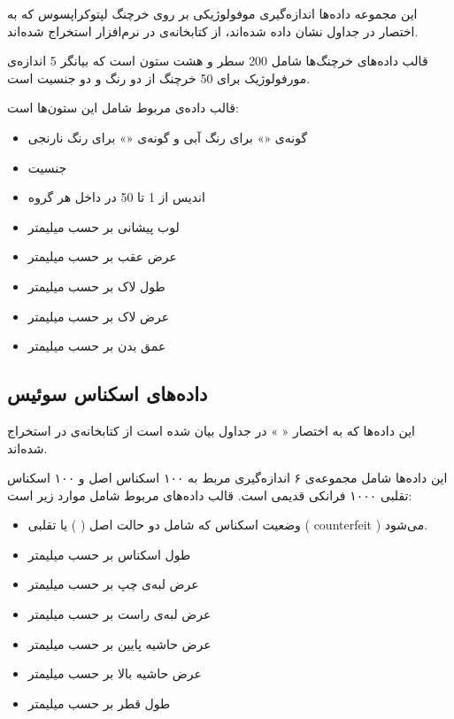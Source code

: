 این مجموعه داده‌ها اندازه‌گیری موفولوژیکی
بر روی خرچنگ لپتوکراپسوس  که به اختصار
در جداول نشان داده شده‌اند، از کتابخانه‌ی 
\cite{rMASS}
در نرم‌افزار 
استخراج شده‌اند.

قالب داده‌های خرچنگ‌ها شامل 200 سطر و هشت ستون است که بیانگر 5 اندازه‌ی مورفولوژیک برای 50 خرچنگ از دو رنگ و دو جنسیت است.

قالب داده‌ی مربوط شامل این ستون‌ها است:

\begin{itemize}
\item
{}
گونه‌ی «» برای رنگ آبی و گونه‌ی «» برای رنگ نارنجی
\item
{}
جنسیت
\item
{}
اندیس از 1 تا 50 در داخل هر گروه
\item
{}
لوب پیشانی بر حسب میلیمتر
\item
{}
عرض عقب بر حسب میلیمتر
\item
{}
طول لاک بر حسب میلیمتر
\item
{}
عرض لاک بر حسب میلیمتر
\item
{}
عمق بدن بر حسب میلیمتر
\end{itemize}

\subsection{
داده‌های اسکناس سوئیس
}

این داده‌ها که به اختصار «
» در جداول بیان شده است از کتابخانه‌ی 
\cite{rmclust}
در 
استخراج شده‌اند.

این داده‌ها شامل مجموعه‌ی ۶ اندازه‌گیری مربط به ۱۰۰ اسکناس اصل و ۱۰۰ اسکناس تقلبی ۱۰۰۰ فرانکی قدیمی است. قالب داده‌های مربوط شامل موارد زیر است:

\begin{itemize}
\item
{}
وضعیت اسکناس که شامل دو حالت اصل (%
%
)
یا تقلبی (%
counterfeit%
) می‌شود.
\item
{}
طول اسکناس بر حسب میلیمتر
\item
{}
عرض لبه‌ی چپ بر حسب میلیمتر
\item
{}
عرض لبه‌ی راست بر حسب میلیمتر
\item
{}
عرض حاشیه پایین بر حسب میلیمتر
\item
{}
عرض حاشیه بالا بر حسب میلیمتر
\item
{}
طول قطر بر حسب میلیمتر
\end{itemize}

